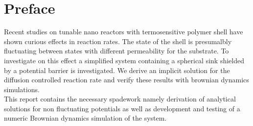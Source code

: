 \section{Preface}
Recent studies on tunable nano reactors with termosensitive polymer shell have shown curious effects in reaction rates.
The state of the shell is presumalbly fluctuating between states with different permeability for the substrate.
To investigate on this effect a simplified system containing a spherical sink shielded by a potential barrier is investigated. We derive an implicit solution for the diffusion controlled reaction rate and verify these results with brownian dynamics simulations.\\
\newline
This report contains the necessary spadework namely derivation of analytical solutions for non fluctuating potentials as well as development and testing of a numeric Brownian dynamics simulation of the system.
\newpage
\tableofcontents
\newpage
